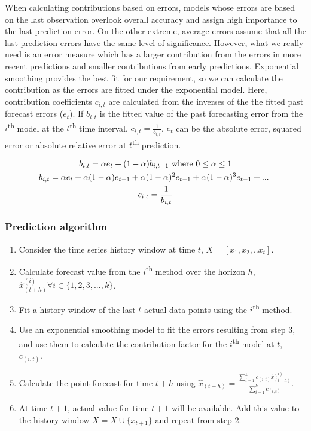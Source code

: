 When calculating contributions based on errors, models whose errors are based on the last observation overlook overall accuracy and assign high importance to the last prediction error. On the other extreme, average errors assume that all the last prediction errors have the same level of significance. However, what we really need is an error measure which has a larger contribution from the errors in more recent predictions and smaller contributions from early predictions. Exponential smoothing provides the best fit for our requirement, so we can calculate the contribution as the errors are fitted under the exponential model. Here, contribution coefficients $c_{i,t}$ are calculated from the inverses of the the fitted past forecast errors ($e_{t}$). If $b_{i,t}$ is the fitted value of the past forecasting error from the $i$\textsuperscript{th} model at the $t$\textsuperscript{th} time interval, $c_{i,t}=\frac{1}{b_{i,t}}$. $e_{t}$ can be the absolute error, squared error or absolute relative error at $t$\textsuperscript{th} prediction.

\begin{multline}
b_{i,t}= \alpha e_t + (1-\alpha)b_{i,t-1} \ \textnormal{where} \ 0\leq \alpha \leq 1	\\ 
b_{i,t}=\alpha e_t + \alpha(1-\alpha)e_{t-1}+\alpha(1-\alpha)^2e_{t-1}+\alpha(1-\alpha)^3e_{t-1}+ . .. \  \\
 c_{i,t}=\frac{1}{b_{i,t}}
\end{multline}

\subsubsection{Prediction algorithm}

\begin{enumerate}
\item Consider the time series history window at time $t$, $X=[x_{1},x_{2},.. x_{t}]$.
\item Calculate forecast value from the $i$\textsuperscript{th} method over the horizon $h$, $\hat{x}_{(t+h)}^{(i)} \forall i \in \{1,2,3,...,k\}$.
\item Fit a history window of the last $t$ actual data points using the $i$\textsuperscript{th} method.
\item Use an exponential smoothing model to fit the errors resulting from step 3, and use them to calculate the contribution factor for the $i$\textsuperscript{th} model at $t$, $c_{(i,t)}$.
\item Calculate the point forecast for time $t+h$ using
$\hat{x}_{(t+h)}= \frac{\sum_{i=1}^{k}c_{(i,t)} \hat{x}_{(t+h)}^{(i)}}{\sum_{i=1}^{k}c_{(i,t)}}$.
\item At time $t+1$, actual value for time $t+1$ will be available. Add this value to the history window $X=X\cup \{x_{t+1}\}$ and repeat from step 2.
\end{enumerate}